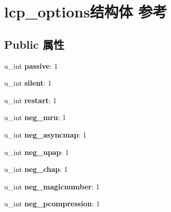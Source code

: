 \hypertarget{structlcp__options}{}\section{lcp\+\_\+options结构体 参考}
\label{structlcp__options}
\subsection*{Public 属性}
\begin{DoxyCompactItemize}
\item 
\mbox{\label{structlcp__options_a87607e320ccc06fb117c7692ae7237c2}} 
u\+\_\+int {\bfseries passive}\+: 1
\item 
\mbox{\label{structlcp__options_afc6311532189f794aafcd60c6efcb724}} 
u\+\_\+int {\bfseries silent}\+: 1
\item 
\mbox{\label{structlcp__options_a94b196db4f863a0914d66cf5fddac5ab}} 
u\+\_\+int {\bfseries restart}\+: 1
\item 
\mbox{\label{structlcp__options_a42ad4ed9a68724a36fadeb62b591ab34}} 
u\+\_\+int {\bfseries neg\+\_\+mru}\+: 1
\item 
\mbox{\label{structlcp__options_af17f704b0fa6dae1dad28f279a743081}} 
u\+\_\+int {\bfseries neg\+\_\+asyncmap}\+: 1
\item 
\mbox{\label{structlcp__options_abbefcc57ba4b7f953046b7b17035e598}} 
u\+\_\+int {\bfseries neg\+\_\+upap}\+: 1
\item 
\mbox{\label{structlcp__options_a115995a67969b908b5de6d178f9dca2e}} 
u\+\_\+int {\bfseries neg\+\_\+chap}\+: 1
\item 
\mbox{\label{structlcp__options_a6f8955933ca4cb4de896d4215e215c5c}} 
u\+\_\+int {\bfseries neg\+\_\+magicnumber}\+: 1
\item 
\mbox{\label{structlcp__options_a5707bf482a905419117a3be4730f8678}} 
u\+\_\+int {\bfseries neg\+\_\+pcompression}\+: 1
\item 

\end{DoxyCompactItemize}
